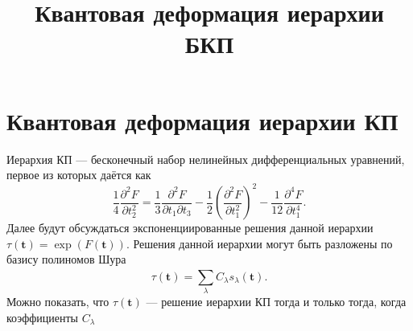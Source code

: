 \documentclass[a4paper, 14pt]{extarticle}
\title{Квантовая деформация иерархии БКП}
\begin{document}
	\maketitle
\section*{Квантовая деформация иерархии КП}
Иерархия КП --- бесконечный набор нелинейных дифференциальных
уравнений, первое из которых даётся как
\[
\frac{1}{4} \frac{\partial ^2F}{\partial t_2^2} =
\frac{1}{3} \frac{\partial ^2 F}{\partial t_1 \partial t_3} 
-\frac{1}{2} \left( \frac{\partial ^2 F}{\partial t_1^2}  \right) ^2 -\frac{1}{12} \frac{\partial ^4F}{\partial t_1^4} 
.\] 
Далее будут обсуждаться экспоненциированные решения
данной иерархии $\tau\left( \mathbf{t} \right) =\exp \left( F(\mathbf{t}) \right) $. Решения данной иерархии
могут быть разложены по базису полиномов Шура
\[
	\tau\left( \mathbf{t} \right) =\sum_{\lambda}^{} C_\lambda s_\lambda\left( \mathbf{t} \right) 
.\] 
Можно показать, что $\tau(\mathbf{t})$ --- решение
иерархии КП тогда и только тогда, когда коэффициенты
$C_\lambda$
\end{document}
